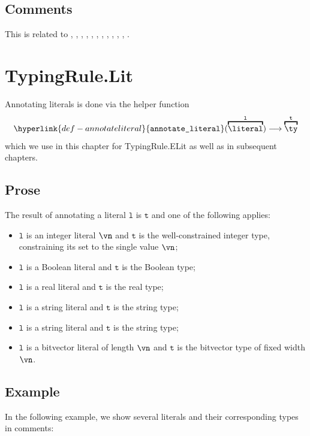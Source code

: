 \documentclass{book}
\newcommand\annotateliteral[1]{\hyperlink{def-annotateliteral}{\texttt{annotate\_literal}}(#1)}
\newcommand\vl[0]{\texttt{l}}
\newcommand\vt[0]{\texttt{t}}
\begin{document}
\subsection{Comments}
  This is related to , , , ,
  , , , , ,
  , , .

\hypertarget{def-annotateliteral}{}
\section{TypingRule.Lit \label{sec:TypingRule.Lit}}

Annotating literals is done via the helper function
\[
  \annotateliteral{\overname{\literal}{\vl}} \aslto \overname{\ty}{\vt}
\]
which we use in this chapter for TypingRule.ELit as well as in subsequent chapters.
\subsection{Prose}
The result of annotating a literal $\vl$ is $\vt$ and one of the following applies:
\begin{itemize}
\item $\vl$ is an integer literal $\vn$ and $\vt$ is the well-constrained integer type, constraining
its set to the single value $\vn$;
\item $\vl$ is a Boolean literal and $\vt$ is the Boolean type;
\item $\vl$ is a real literal and $\vt$ is the real type;
\item $\vl$ is a string literal and $\vt$ is the string type;
\item $\vl$ is a string literal and $\vt$ is the string type;
\item $\vl$ is a bitvector literal of length $\vn$ and $\vt$ is the bitvector type of fixed width $\vn$.
\end{itemize}

\subsection{Example}
In the following example, we show several literals and their corresponding types in comments:

\end{document}
